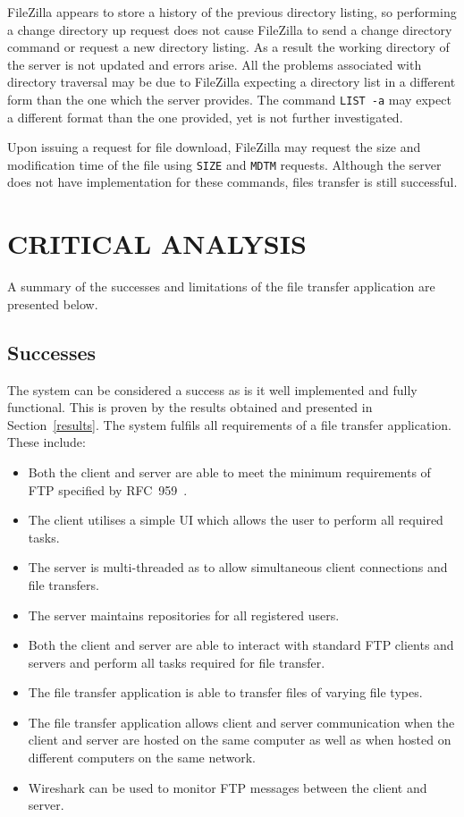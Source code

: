 \documentclass[10pt,twocolumn]{witseiepaper}
\begin{document}
FileZilla appears to store a history of the previous directory listing, so performing a change directory up request does not cause FileZilla to send a change directory command or request a new directory listing. As a result the working directory of the server is not updated and errors arise. All the problems associated with directory traversal may be due to FileZilla expecting a directory list in a different form than the one which the server provides. The command \texttt{LIST~-a} may expect a different format than the one provided, yet is not further investigated.

Upon issuing a request for file download, FileZilla may request the size and modification time of the file using \texttt{SIZE} and \texttt{MDTM} requests. Although the server does not have implementation for these commands, files transfer is still successful.

\section{CRITICAL ANALYSIS}

A summary of the successes and limitations of the file transfer application are presented below.

\subsection{Successes}

The system can be considered a success as is it well implemented and fully functional. This is proven by the results obtained and presented in Section~\ref{results}. The system fulfils all requirements of a file transfer application. These include:
\vspace*{-4mm}
\begin{itemize}
	\item Both the client and server are able to meet the minimum requirements of FTP specified by RFC~959~\cite{rfc959}.
	\item The client utilises a simple UI which allows the user to perform all required tasks.
	\item The server is multi-threaded as to allow simultaneous client connections and file transfers.
	\item The server maintains repositories for all registered users.
	\item Both the client and server are able to interact with standard FTP clients and servers and perform all tasks required for file transfer.
	\item The file transfer application is able to transfer files of varying file types.
	\item The file transfer application allows client and server communication when the client and server are hosted on the same computer as well as when hosted on different computers on the same network.
	\item Wireshark can be used to monitor FTP messages between the client and server. 
\end{itemize} 
\vspace*{-10mm}
\end{document}

